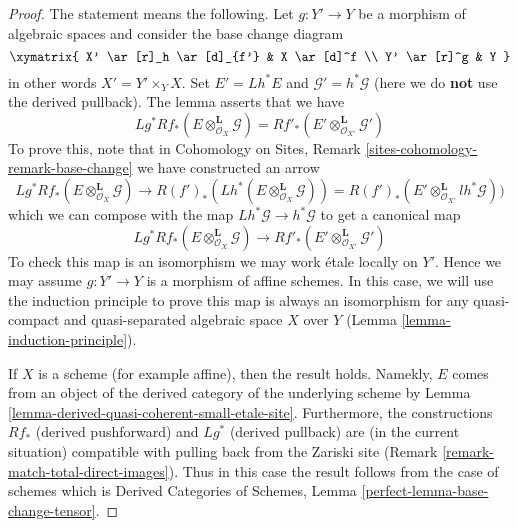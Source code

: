 \begin{proof}
The statement means the following. Let $g : Y' \to Y$ be a morphism of
algebraic spaces and consider the base change diagram
$$
\xymatrix{
X' \ar[r]_h \ar[d]_{f'} &
X \ar[d]^f \\
Y' \ar[r]^g &
Y
}
$$
in other words $X' = Y' \times_Y X$. Set $E' = Lh^*E$ and
$\mathcal{G}' = h^*\mathcal{G}$ (here we do {\bf not} use the derived
pullback). The lemma asserts that we have
$$
Lg^*Rf_*(E \otimes^\mathbf{L}_{\mathcal{O}_X} \mathcal{G}) =
Rf'_*(E' \otimes^\mathbf{L}_{\mathcal{O}_{X'}} \mathcal{G}')
$$
To prove this, note that in
Cohomology on Sites, Remark \ref{sites-cohomology-remark-base-change}
we have constructed an arrow
$$
Lg^*Rf_*(E \otimes^\mathbf{L}_{\mathcal{O}_X} \mathcal{G})
\longrightarrow
R(f')_*(Lh^*(E \otimes^\mathbf{L}_{\mathcal{O}_X} \mathcal{G})) =
R(f')_*(E' \otimes^\mathbf{L}_{\mathcal{O}_{X'}} lh^*\mathcal{G}))
$$
which we can compose with the map $Lh^*\mathcal{G} \to h^*\mathcal{G}$
to get a canonical map
$$
Lg^*Rf_*(E \otimes^\mathbf{L}_{\mathcal{O}_X} \mathcal{G})
\longrightarrow
Rf'_*(E' \otimes^\mathbf{L}_{\mathcal{O}_{X'}} \mathcal{G}')
$$
To check this map is an isomorphism we may work \'etale locally on $Y'$.
Hence we may assume $g : Y' \to Y$ is a morphism of affine schemes.
In this case, we will use the induction principle to prove this map
is always an isomorphism for any quasi-compact and quasi-separated
algebraic space $X$ over $Y$ (Lemma
\ref{lemma-induction-principle}).

\medskip\noindent
If $X$ is a scheme (for example affine), then the result holds.
Namekly, $E$ comes from an object of the derived category of the
underlying scheme by Lemma \ref{lemma-derived-quasi-coherent-small-etale-site}.
Furthermore, the constructions $Rf_*$ (derived pushforward) and $Lg^*$
(derived pullback) are (in the current situation) compatible with pulling back
from the Zariski site (Remark \ref{remark-match-total-direct-images}).
Thus in this case the result follows from the case of schemes which is
Derived Categories of Schemes, Lemma \ref{perfect-lemma-base-change-tensor}.


\end{proof}
